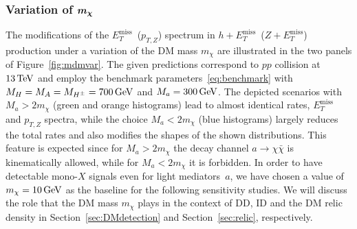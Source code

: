 \documentclass[a4paper, 11pt,notoc]{article}
\newcommand{\MET}{\ensuremath{E_T^\mathrm{miss}}\xspace}
\newcommand{\mA}{\ensuremath{M_{A}}\xspace}
\newcommand{\ma}{\ensuremath{M_{a}}\xspace}
\newcommand{\mH}{\ensuremath{M_{H}}\xspace}
\newcommand{\mHc}{\ensuremath{M_{H^{\pm}}}\xspace}
\def\bm#1{\mbox{\boldmath$#1$\unboldmath}}
\begin{document}
\subsubsection[Variation of $m_\chi$]{Variation of $\bm{m_\chi}$}

The modifications of the $\MET$~($p_{T,Z}$) spectrum in $h+\MET$~($Z+\MET$) production under a variation of the DM mass $m_\chi$ are illustrated in the two panels of Figure~\ref{fig:mdmvar}. The given predictions correspond to $pp$ collision at $13 \, {\rm TeV}$ and employ the benchmark parameters~\eqref{eq:benchmark} with $\mH = \mA = \mHc = 700 \, {\rm GeV}$ and $\ma = 300 \, {\rm GeV}$. The depicted scenarios with $\ma  > 2 m_\chi$ (green and orange histograms) lead to almost identical rates, $\MET$ and $p_{T,Z}$ spectra, while the choice $\ma  < 2 m_\chi$ (blue histograms) largely reduces the total rates and also modifies the shapes of the shown distributions. This feature is expected since for $\ma > 2 m_\chi$ the decay channel $a \to \chi \bar \chi$ is kinematically allowed, while for $\ma < 2 m_\chi$ it is forbidden. In order to have detectable mono-$X$ signals even for light mediators~$a$, we have chosen a value of  $m_\chi = 10 \, {\rm GeV}$ as the baseline for the following sensitivity studies.  We will discuss the role that the DM mass $m_\chi$ plays in the context of DD, ID and the DM relic density in Section~\ref{sec:DMdetection}  and Section~\ref{sec:relic}, respectively. 
\end{document}
